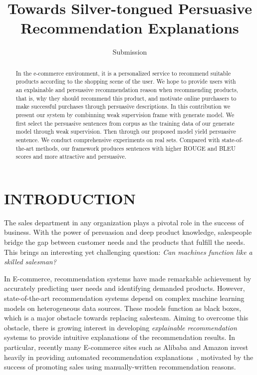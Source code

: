 \documentclass[sigconf]{acmart}
\begin{document}
\title{Towards Silver-tongued Persuasive Recommendation Explanations}

\author{Submission }


\begin{abstract}
In the e-commerce environment, it is a personalized service to recommend suitable products according to the shopping scene of the user. We hope to provide users with an explainable and persuasive recommendation reason when recommending products, that is, why they should recommend this product, and motivate online purchasers to make successful purchases through persuasive descriptions. In this contribution we present our system by combinning weak supervision frame with generate model.  We first select the persuasive sentences from corpus as the training data of our generate model through weak supervision. Then through our proposed model yield persuasive sentence. We conduct comprehensive experiments on real sets. Compared with state-of-the-art methods, our framework produces sentences with higher ROUGE and BLEU scores and more attractive and persuasive.

\end{abstract}



\maketitle

\section{INTRODUCTION}

The sales department in any organization plays a pivotal role in the success of business. 
With the power of persuasion and deep product knowledge, salespeople bridge the gap between customer needs and the products that fulfill the needs. This brings an interesting yet challenging question: \textit{ Can machines function like a skilled salesman?} 

In E-commerce, recommendation systems have made remarkable achievement by accurately predicting user needs and identifying demanded products. 
However, state-of-the-art recommendation systems depend on complex machine learning models on heterogeneous data sources. 
These models function as black boxes, which is a major obstacle towards replacing salesteam. 
Aiming to overcome this obstacle, there is growing interest in developing \textit{explainable recommendation} systems to provide intuitive explanations of the recommendation results. 
In particular, recently many E-commerce sites such as Alibaba and Amazon invest heavily in providing automated recommendation explanations~\cite{}, motivated by the success of promoting sales using manually-written recommendation reasons. 
\end{document}
